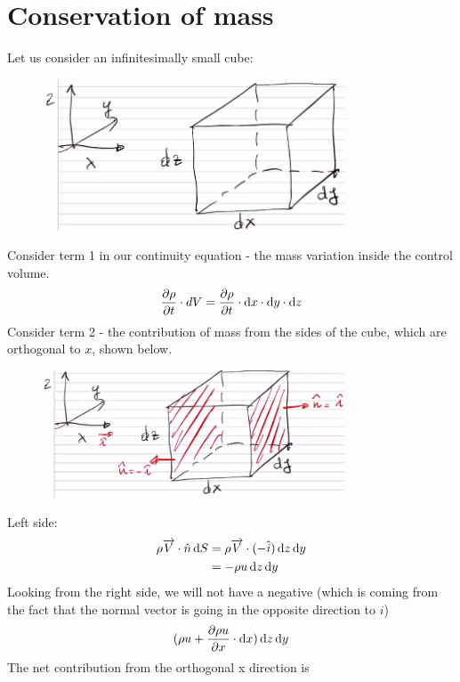 \documentclass[class=report, crop=false, 12pt,a4paper]{standalone}
\begin{document}
\section{Conservation of mass}
Let us consider an infinitesimally small cube:
\begin{figure}[H]
  \centering
  \includegraphics[width = 0.8\textwidth]{../img/infinitesimalcube.png}
\end{figure}
Consider term 1 in our continuity equation - the mass variation inside the control volume. 
$$\frac{\partial \rho}{\partial t} \cdot dV = \frac{\partial \rho}{\partial t} \cdot\dif x \cdot \dif y \cdot \dif z$$
Consider term 2 - the contribution of mass from the sides of the cube, which are orthogonal to $x$, shown below.
\begin{figure}[H]
  \centering
  \includegraphics[width = 0.8\textwidth]{../img/infinitesimalcubewithorthox.png}
\end{figure}
Left side:
\begin{align}
  \rho \overrightarrow{V} \cdot \hat{n} \dif S &= \rho \overrightarrow{V} \cdot (-\hat{i}) \dif z \dif y\\
  &= - \rho u \dif z \dif y
\end{align}
Looking from the right side, we will not have a negative (which is coming from the fact that the normal vector is going in the opposite direction to $i$)
\begin{equation}
  (\rho u + \frac{\partial \rho u}{\partial x} \cdot \dif x) \dif z \dif y
\end{equation}
The net contribution from the orthogonal x direction is
\end{document}
